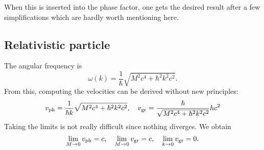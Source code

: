 \documentclass[11pt, english, fleqn, DIV=15, headinclude, BCOR=1.5cm]{scrartcl}
\begin{document}
When this is inserted into the phase factor, one gets the desired result after
a few simplifications which are hardly worth mentioning here.

\subsection{Relativistic particle}

The angular frequency is
\[
    \omega(k) = \frac{1}{\hbar} \sqrt{M^2 c^4 + \hbar^2 k^2 c^2}.
\]
From this, computing the velocities can be derived without new principles:
\[
    v_\text{ph} = \frac{1}{\hbar k} \sqrt{M^2 c^4 + \hbar^2 k^2 c^2}
    ,\quad
    v_\text{gr} = \frac{\hbar}{\sqrt{M^2 c^4 + \hbar^2 k^2 c^2}} h c^2
\]
Taking the limits is not really difficult since nothing diverges. We obtain
\[
    \lim_{M \to 0} v_\text{ph} = c
    ,\quad
    \lim_{M \to 0} v_\text{gr} = c
    ,\quad
    \lim_{k \to 0} v_\text{gr} = 0.
\]
\end{document}
